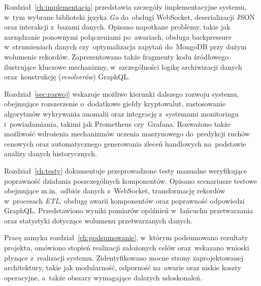 Rozdział~\ref{ch:implementacja} przedstawia szczegóły implementacyjne systemu, w~tym wybrane biblioteki języka \textit{Go} do~obsługi WebSocket, deserializacji JSON oraz interakcji z~bazami danych.
Opisano napotkane problemy, takie jak zarządzanie ponownymi połączeniami po~awariach, obsługa backpressure w~strumieniach danych czy~optymalizacja zapytań do~MongoDB przy dużym wolumenie rekordów.
Zaprezentowano także fragmenty kodu źródłowego ilustrujące kluczowe mechanizmy, w~szczególności logikę archiwizacji danych oraz~konstrukcję (\textit{resolverów}) GraphQL\@.

Rozdział~\ref{sec:rozwoj} wskazuje możliwe kierunki dalszego rozwoju systemu, obejmujące rozszerzenie o~dodatkowe giełdy kryptowalut, zastosowanie algorytmów wykrywania anomalii oraz integrację z~systemami monitoringu i~powiadamiania, takimi jak Prometheus czy~Grafana.
Rozważono także możliwość wdrożenia mechanizmów uczenia maszynowego do~predykcji ruchów cenowych oraz automatycznego generowania zleceń handlowych na~podstawie analizy danych historycznych.

Rozdział~\ref{ch:testy} dokumentuje przeprowadzone testy manualne weryfikujące poprawność działania poszczególnych komponentów.
Opisano scenariusze testowe obejmujące m.in.\ odbiór danych z~WebSocket, transformację rekordów w~procesach \textit{ETL}, obsługę awarii komponentów oraz poprawność odpowiedzi GraphQL\@.
Przedstawiono wyniki pomiarów opóźnień w~łańcuchu przetwarzania oraz statystyki dotyczące wolumenu przetwarzanych danych.

Pracę zamyka rozdział~\ref{ch:podsumowanie}, w~którym podsumowano rezultaty projektu, omówiono stopień realizacji założonych celów oraz~wskazano wnioski płynące z~realizacji systemu.
Zidentyfikowano mocne strony zaprojektowanej architektury, takie jak modularność, odporność na~awarie oraz niskie koszty operacyjne, a~także obszary wymagające dalszych udoskonaleń.

